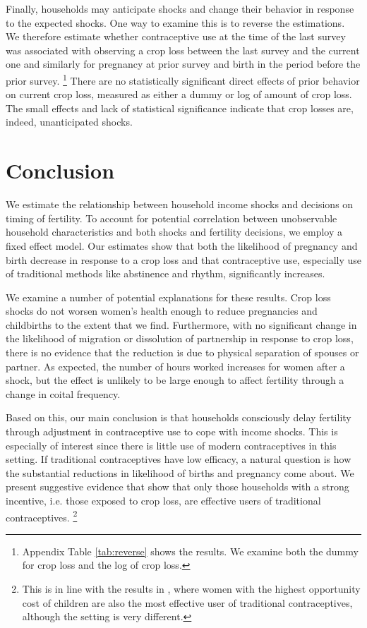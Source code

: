 \documentclass[letterpaper,12pt]{article}
\begin{document}

Finally, households may anticipate shocks and
change their behavior in response to the expected shocks.
One way to examine this is to reverse the estimations.
We therefore estimate whether contraceptive use at the time of the last 
survey was associated with observing a crop loss between the last survey
and the current one and similarly for pregnancy at prior survey and 
birth in the period before the prior survey.%
\footnote{
Appendix Table \ref{tab:reverse} shows the results.
We examine both the dummy for crop loss and the log of crop loss.
}
There are no statistically significant direct effects of 
prior behavior on current crop loss, measured as either a
dummy or log of amount of crop loss.
The small effects and lack of statistical significance 
indicate that crop losses are, indeed, unanticipated 
shocks.


\section{Conclusion}

We estimate the relationship between household income shocks and decisions
on timing of fertility. 
To account for potential correlation between unobservable household
characteristics and both shocks and fertility decisions, we employ a fixed effect model.
Our estimates show that both the likelihood of pregnancy and birth decrease in
response to a crop loss and that contraceptive use, especially use of traditional 
methods like abstinence and rhythm, significantly increases. 

We examine a number of potential explanations for these results.
Crop loss shocks do not worsen women's health enough to 
reduce pregnancies and childbirths to the extent that we find.
Furthermore, with no significant change in the likelihood of migration or 
dissolution of partnership in response to crop loss, there is no evidence 
that the reduction is due to physical separation of spouses or partner.
As expected, the number of hours worked increases for women after a shock, 
but the effect is unlikely to be large enough to affect fertility 
through a change in coital frequency.

Based on this, our main conclusion is that households consciously delay 
fertility through adjustment in contraceptive use to cope 
with income shocks. 
This is especially of interest since there is little use of modern
contraceptives in this setting.
If traditional contraceptives have low efficacy, a natural question is 
how the substantial reductions in likelihood of births and pregnancy 
come about.
We present suggestive evidence that show that only those households
with a strong incentive, i.e. those exposed to crop loss, are 
effective users of traditional contraceptives.%
\footnote{
This is in line with the results in \cite{Rosenzweig1989},
where women with the highest opportunity cost of children
are also the most effective user of traditional contraceptives,
although the setting is very different.
}
\end{document}
